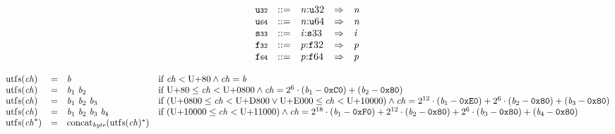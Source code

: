 \vspace{1ex}

$$
\begin{array}{@{}l@{}rrlll@{}l@{}}
& {\mathtt{u{\scriptstyle32}}} &::=& {\mathit{n}}{:}{{\mathtt{u}}}{32} &\Rightarrow& {\mathit{n}} \\
& {\mathtt{u{\scriptstyle64}}} &::=& {\mathit{n}}{:}{{\mathtt{u}}}{64} &\Rightarrow& {\mathit{n}} \\
& {\mathtt{s{\scriptstyle33}}} &::=& {\mathit{i}}{:}{{\mathtt{s}}}{33} &\Rightarrow& {\mathit{i}} \\
& {\mathtt{f{\scriptstyle32}}} &::=& {\mathit{p}}{:}{{\mathtt{f}}}{32} &\Rightarrow& {\mathit{p}} \\
& {\mathtt{f{\scriptstyle64}}} &::=& {\mathit{p}}{:}{{\mathtt{f}}}{64} &\Rightarrow& {\mathit{p}} \\
\end{array}
$$

\vspace{1ex}

$$
\begin{array}{@{}lcl@{}l@{}}
{\mathrm{utf{\scriptstyle8}}}({\mathit{ch}}) &=& {\mathit{b}} &\quad
  \mbox{if}~{\mathit{ch}} < \mathrm{U{+}80} \land {\mathit{ch}} = {\mathit{b}} \\
{\mathrm{utf{\scriptstyle8}}}({\mathit{ch}}) &=& {\mathit{b}}_{{1}}~{\mathit{b}}_{{2}} &\quad
  \mbox{if}~\mathrm{U{+}80} \leq {\mathit{ch}} < \mathrm{U{+}0800} \land {\mathit{ch}} = {2^{6}} \cdot ({\mathit{b}}_{{1}} - \mathtt{0xC0}) + ({\mathit{b}}_{{2}} - \mathtt{0x80}) \\
{\mathrm{utf{\scriptstyle8}}}({\mathit{ch}}) &=& {\mathit{b}}_{{1}}~{\mathit{b}}_{{2}}~{\mathit{b}}_{{3}} &\quad
  \mbox{if}~(\mathrm{U{+}0800} \leq {\mathit{ch}} < \mathrm{U{+}D800} \lor \mathrm{U{+}E000} \leq {\mathit{ch}} < \mathrm{U{+}10000}) \land {\mathit{ch}} = {2^{12}} \cdot ({\mathit{b}}_{{1}} - \mathtt{0xE0}) + {2^{6}} \cdot ({\mathit{b}}_{{2}} - \mathtt{0x80}) + ({\mathit{b}}_{{3}} - \mathtt{0x80}) \\
{\mathrm{utf{\scriptstyle8}}}({\mathit{ch}}) &=& {\mathit{b}}_{{1}}~{\mathit{b}}_{{2}}~{\mathit{b}}_{{3}}~{\mathit{b}}_{{4}} &\quad
  \mbox{if}~(\mathrm{U{+}10000} \leq {\mathit{ch}} < \mathrm{U{+}11000}) \land {\mathit{ch}} = {2^{18}} \cdot ({\mathit{b}}_{{1}} - \mathtt{0xF0}) + {2^{12}} \cdot ({\mathit{b}}_{{2}} - \mathtt{0x80}) + {2^{6}} \cdot ({\mathit{b}}_{{3}} - \mathtt{0x80}) + ({\mathit{b}}_{{4}} - \mathtt{0x80}) \\
{\mathrm{utf{\scriptstyle8}}}({{\mathit{ch}}^\ast}) &=& {{\mathrm{concat}}}_{{\mathit{byte}}}({{\mathrm{utf{\scriptstyle8}}}({\mathit{ch}})^\ast}) &  \\
\end{array}
$$

